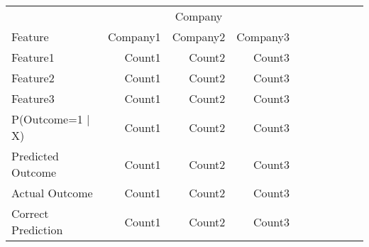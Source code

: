 \begin{tabular}{lrrrrrrrrr} \toprule
& \multicolumn{3}{c}{Company} \\
Feature                 & Company1  & Company2  & Company3  \\ \midrule
Feature1                & Count1    & Count2    & Count3    \\
Feature2                & Count1    & Count2    & Count3    \\
Feature3                & Count1    & Count2    & Count3    \\ \midrule
P(Outcome=1 | X)        & Count1    & Count2    & Count3    \\
Predicted Outcome       & Count1    & Count2    & Count3    \\
Actual Outcome          & Count1    & Count2    & Count3    \\
Correct Prediction      & Count1    & Count2    & Count3    \\
\bottomrule \end{tabular}
